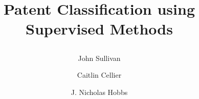 \documentclass{article}
\title{
\LARGE\bf Patent Classification using Supervised Methods \\
\date{}
\author{ John Sullivan \and Caitlin Cellier \and J. Nicholas Hobbs}
}
\begin{document}
\maketitle



\thispagestyle{fancy}

\maketitle






%


\thispagestyle{fancy}


\cite*{zhang-nivre-12}




\end{document}
